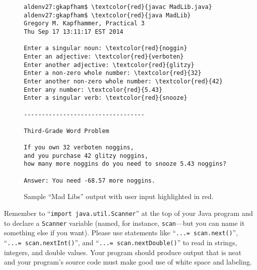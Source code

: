 \begin{figure}[tb]
\begin{Verbatim}[commandchars=\\\{\}]
aldenv27:gkapfham$ \textcolor{red}{javac MadLib.java}
aldenv27:gkapfham$ \textcolor{red}{java MadLib}
Gregory M. Kapfhammer, Practical 3
Thu Sep 17 13:11:17 EST 2014

Enter a singular noun: \textcolor{red}{noggin}
Enter an adjective: \textcolor{red}{verboten}
Enter another adjective: \textcolor{red}{glitzy}
Enter a non-zero whole number: \textcolor{red}{32}
Enter another non-zero whole number: \textcolor{red}{42}
Enter any number: \textcolor{red}{5.43}
Enter a singular verb: \textcolor{red}{snooze}

----------------------------------

Third-Grade Word Problem

If you own 32 verboten noggins,
and you purchase 42 glitzy noggins,
how many more noggins do you need to snooze 5.43 noggins?

Answer: You need -68.57 more noggins.
\end{Verbatim}
\vspace*{-.1in}
\caption{Sample ``Mad Libs'' output with user input highlighted in red.}
\label{mad}
\end{figure}

\noindent Remember to ``{\tt import java.util.Scanner}'' at the top of your Java program and to declare a {\tt Scanner}
variable (named, for instance, {\tt scan}---but you can name it something else if you want). Please use statements like
``{\tt...= scan.next()}'', ``{\tt...= scan.nextInt()}'', and ``{\tt...= scan.next\-Double()}'' to read in strings,
integers, and double values. Your program should produce output that is neat and your program's source code must make
good use of white space and labeling.

\vspace*{-.15in}
